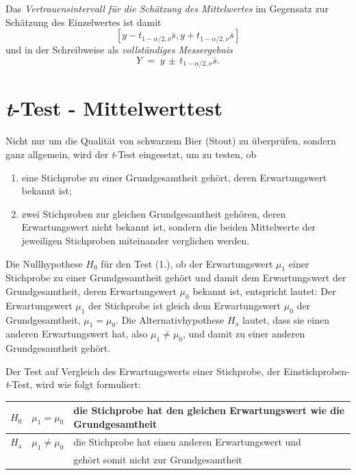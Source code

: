 Das \textsl{Vertrauensintervall für die Schätzung des Mittelwertes} im Gegensatz zur
Schätzung des Einzelwertes ist damit
$$
[y - t_{1-\alpha/2,\nu} \bar s, y + t_{1-\alpha/2,\nu} \bar s]
$$
und in der Schreibweise als \textsl{vollständiges Messergebnis}
\begin{equation}
Y \; = \; y \, \pm \, t_{1-\alpha/2,\nu} \bar s .
\label{vollstaendigesErgebMittelwert}
\end{equation}




\section{\textsl{t}-Test - Mittelwerttest}


Nicht nur um die Qualität von schwarzem Bier (Stout) zu überprüfen, sondern ganz
allgemein, wird der \textsl{t}-Test eingesetzt, um zu testen, ob
\begin{enumerate}
\item eine Stichprobe zu einer Grundgesamtheit gehört,
 deren Erwartungswert bekannt ist;
\item zwei Stichproben zur gleichen Grundgesamtheit gehören,
 deren Erwartungswert nicht bekannt ist, sondern die beiden
 Mittelwerte der jeweiligen Stichproben miteinander verglichen werden.
\end{enumerate}

Die Nullhypothese $H_0$ für den Test (1.), ob der Erwartungswert $\mu_1$ einer
Stichprobe zu einer Grundgesamtheit gehört
und damit dem Erwartungswert der Grundgesamtheit, deren Erwartungswert $\mu_0$ bekannt ist,
entspricht lautet: Der Erwartungswert $\mu_1$ der Stichprobe
ist gleich dem  Erwartungswert $\mu_0$ der Grundgesamtheit, $\mu_1 = \mu_0$.
Die Alternativhypothese $H_\mathrm{a}$
lautet, dass sie einen anderen Erwartungswert hat, also $\mu_1 \neq \mu_0$,
und damit zu einer anderen Grundgesamtheit gehört.

Der Test auf Vergleich des Erwartungswerts einer Stichprobe, der Einstichproben-\textsl{t}-Test,
wird wie folgt formuliert:
\begin{center}
\setlength{\extrarowheight}{.5em}
\begin{tabular}{c|cl}
$H_0$ & $\mu_1 = \mu_0$ & die Stichprobe hat den gleichen Erwartungswert wie die Grundgesamtheit\\
\hline
$H_\mathrm{a}$ & $\mu_1 \neq \mu_0$ & die Stichprobe hat einen anderen Erwartungswert und\\
 & & gehört somit nicht zur Grundgesamtheit
\end{tabular}
\end{center}

